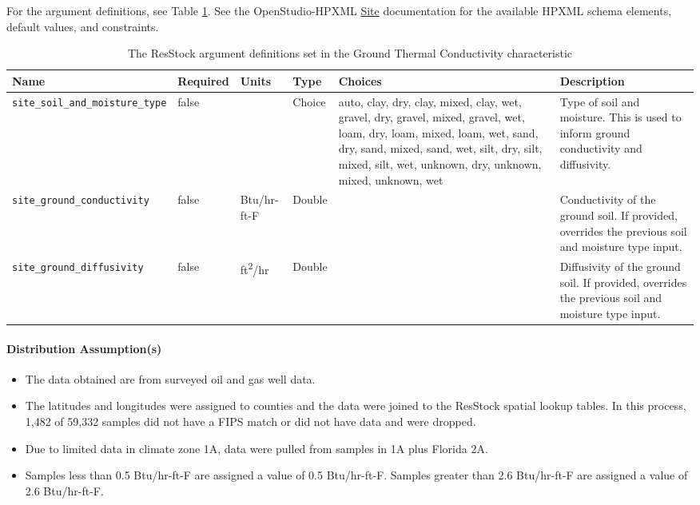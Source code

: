 For the argument definitions, see Table \ref{table:hc_arg_def_ground_k}. See the OpenStudio-HPXML \href{https://openstudio-hpxml.readthedocs.io/en/v1.8.1/workflow_inputs.html\#hpxml-site}{Site} documentation for the available HPXML schema elements, default values, and constraints.


\begin{longtable}[]{|p{3.5cm}|p{1.5cm}|p{1.3cm}|p{1.1cm}|p{}|p{3.3cm}|} \caption{The ResStock argument definitions set in the Ground Thermal Conductivity characteristic} \label{table:hc_arg_def_ground_k} \\

\toprule\noalign{}
Name & Required & Units & Type & Choices & Description \\
\midrule\noalign{}
\endhead
\bottomrule\noalign{}
\endlastfoot
\texttt{site\_soil\_and\_moisture\_type} & false & & Choice & auto,
clay, dry, clay, mixed, clay, wet, gravel, dry, gravel, mixed, gravel,
wet, loam, dry, loam, mixed, loam, wet, sand, dry, sand, mixed, sand,
wet, silt, dry, silt, mixed, silt, wet, unknown, dry, unknown, mixed,
unknown, wet & Type of soil and moisture. This is used to inform ground
conductivity and diffusivity.  \\ \hline
\texttt{site\_ground\_conductivity} & false & Btu/hr-ft-F & Double & &
Conductivity of the ground soil. If provided, overrides the previous
soil and moisture type input. \\ \hline
\texttt{site\_ground\_diffusivity} & false & ft\textsuperscript{2}/hr & Double & &
Diffusivity of the ground soil. If provided, overrides the previous soil
and moisture type input. \\
\end{longtable}
\paragraph{Distribution Assumption(s)}
\begin{itemize}
\item
  The data obtained are from surveyed oil and gas well data.
\item
  The latitudes and longitudes were assigned to counties and the data were
  joined to the ResStock spatial lookup tables. In this process, 1,482 of
  59,332 samples did not have a FIPS match or did not have data and were
  dropped.
\item
  Due to limited data in climate zone 1A, data were pulled from samples
  in 1A plus Florida 2A.
\item
  Samples less than 0.5 Btu/hr-ft-F are assigned a value of 0.5
  Btu/hr-ft-F. Samples greater than 2.6 Btu/hr-ft-F are assigned a value
  of 2.6 Btu/hr-ft-F.
\end{itemize}








